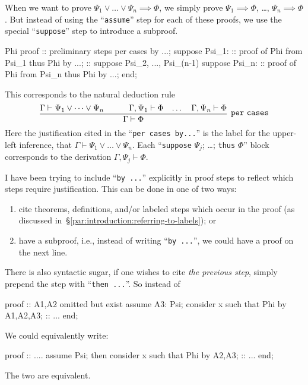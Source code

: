 When we want to prove $\Psi_{1}\lor\dots\lor\Psi_{n}\implies \Phi$,
we simply prove $\Psi_{1}\implies\Phi$, \dots, $\Psi_{n}\implies\Phi$.
But instead of using the ``\verb#assume#'' step for each of these
proofs, we use the special ``\verb#suppose#'' step to introduce a
subproof.
\begin{mizar}
Phi
proof
  :: preliminary steps
  per cases by ...;
  suppose Psi_1:
    :: proof of Phi from Psi_1
    thus Phi by ...;
  :: suppose Psi_2, ..., Psi_(n-1)
  suppose Psi_n:
    :: proof of Phi from Psi_n
    thus Phi by ...;
end;
\end{mizar}
This corresponds to the natural deduction rule
\begin{equation}
  \infer[\mathtt{per~cases}]{\Gamma\vdash \Phi}{%
    \Gamma\vdash\Psi_{1}\lor\dots\lor\Psi_{n}
    & \qquad\Gamma,\Psi_{1}\vdash\Phi
    & \dots
    & \Gamma,\Psi_{n}\vdash\Phi}
\end{equation}
Here the justification cited in the ``\verb#per cases by...#'' is the
label for the upper-left inference, that $\Gamma\vdash\Psi_{1}\lor\dots\lor\Psi_{n}$.
Each ``\verb#suppose# $\Psi_{j}$; \dots; \verb#thus# $\Phi$'' block
corresponds to the derivation $\Gamma,\Psi_{j}\vdash\Phi$.

I have been trying to include ``\verb#by ...#'' explicitly in proof
steps to reflect which steps require justification. This can be done in
one of two ways:
\begin{enumerate}
\item cite theorems, definitions, and/or labeled steps which occur in
  the proof (as discussed in~\S\ref{par:introduction:referring-to-labels}); or
\item have a subproof, i.e., instead of writing ``\verb#by ...#'', we
  could have a proof on the next line.
\end{enumerate}
There is also syntactic sugar, if one wishes to cite \emph{the previous step},
simply prepend the step with ``\verb#then ...#''. So instead of
\begin{mizar}
proof
  :: A1,A2 omitted but exist
  assume A3: Psi;
  consider x such that Phi by A1,A2,A3;
  :: ...
end;
\end{mizar}
We could equivalently write:
\begin{mizar}
proof
  :: ....
  assume Psi;
  then consider x such that Phi by A2,A3;
  :: ...
end;
\end{mizar}
The two are equivalent.

